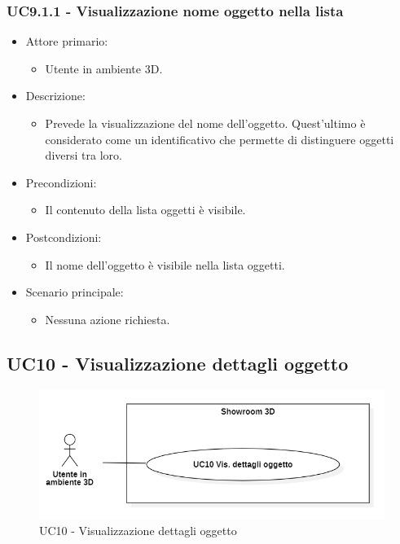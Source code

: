 \subsubsection{UC9.1.1 - Visualizzazione nome oggetto nella lista}
\begin{itemize}

	\item Attore primario: 
	\begin{itemize}
		\item Utente in ambiente 3D.
	\end{itemize}
	\item Descrizione:
	\begin{itemize}
		\item Prevede la visualizzazione del nome dell’oggetto. Quest'ultimo è considerato come un identificativo che permette di distinguere oggetti diversi tra loro.
	\end{itemize}
	
	\item Precondizioni:
	\begin{itemize}
		\item Il contenuto della lista oggetti è visibile.
	\end{itemize}
	
	\item Postcondizioni:
	\begin{itemize}
		\item Il nome dell'oggetto è visibile nella lista oggetti.
	\end{itemize}
	
	\item Scenario principale:
	\begin{itemize}
		\item Nessuna azione richiesta.
	\end{itemize}
	
\end{itemize}

\pagebreak

\subsection{UC10 - Visualizzazione dettagli oggetto}

\begin{figure}[H]
  \renewcommand{\thefigure}{11}
  \includegraphics[width=\linewidth]{./res/images/UC10.png}
  \caption{UC10 - Visualizzazione dettagli oggetto}
  \label{fig:UC 10}
\end{figure}

